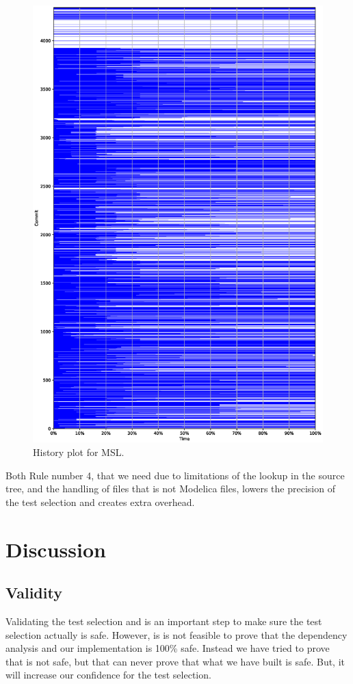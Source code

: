 \documentclass{cslthse-msc}
\begin{document}
\begin{figure}[!htbp]
    \centering
    \includegraphics[width=\textwidth]{Graphs/MSL_history_plot.eps}
    \caption{History plot for MSL.}
    \label{fig:mslhistory}
\end{figure}
 
 Both Rule number 4, that we need due to limitations of the lookup in the source tree, and the handling of files that is not Modelica files, lowers the precision of the test selection and creates extra overhead.

\chapter[Discussion]{Discussion}

\section{Validity}
Validating the test selection and is an important step to make sure the test selection actually is safe. 
However, is is not feasible to prove that the dependency analysis and our implementation is 100\% safe. Instead we have tried to prove that is not safe, but that can never prove that what we have built is safe. But, it will increase our confidence for the test selection. 
\end{document}
